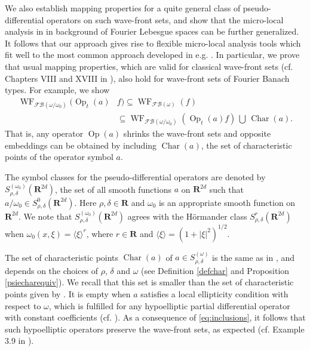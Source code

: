\documentclass[12pt,a4paper,reqno]{amsart}
\numberwithin{equation}{section}
\numberwithin{thm}{section}
\theoremstyle{definition}
\theoremstyle{remark}
\begin{document}
We also establish mapping properties for a quite general class of
pseudo-differential operators on such wave-front sets, 
and show that the micro-local analysis in \cite{PTT1} in background
of Fourier Lebesgue spaces can be further generalized. It follows that our approach
gives rise to flexible micro-local analysis tools which fit well to
the most common approach developed in e.g. \cite {Ho1,
Hrm-nonlin}. In particular, we prove that
usual mapping properties, which are valid for classical wave-front
sets (cf. Chapters VIII and XVIII in \cite{Ho1}), also hold for
wave-front sets of Fourier Banach types.
For example, we show
\begin{equation}\label{eq:inclusions}
\begin{aligned}
{\operatorname{WF}} _{{\mathscr F\! \mathscr B}(\omega /\omega _0)}({\operatorname{Op}} _t (a) &f)\subseteq {\operatorname{WF}} _{{\mathscr F\! \mathscr B}(\omega
)}(f)\\
&
\subseteq {\operatorname{WF}} _{{\mathscr F\! \mathscr B}(\omega /\omega
_0)}({\operatorname{Op}} _t (a) f){{\textstyle{\, \bigcup \, }}} {\operatorname{Char}} (a).
\end{aligned}
\end{equation}
That is, any operator
${\operatorname{Op}} (a)$ shrinks the wave-front sets and opposite embeddings can be
obtained by including ${\operatorname{Char}} (a)$, the set of characteristic points of
the operator symbol $a$.

\par

The symbol classes for the pseudo-differential operators are denoted by
$S_{\rho ,\delta}^{(\omega _0)}({\mathbf R^{{2d}}})$, the set of all
smooth functions $a$ on ${\mathbf R^{{2d}}}$ such that $a/\omega _0\in S^0_{\rho
,\delta}({\mathbf R^{{2d}}})$. Here $\rho ,\delta \in \mathbf R$ and $\omega_0$ is
an appropriate smooth function on ${\mathbf R^{{2d}}}$. We note that $S_{\rho ,\delta}^{(\omega _0)}({\mathbf R^{{2d}}})$ agrees
with the H{\"o}rmander class $S^r_{\rho ,\delta}({\mathbf R^{{2d}}})$ when
$\omega _0(x, \xi )={\langle \xi\rangle} ^r$, where $r\in \mathbf R$ and ${\langle \xi\rangle}
=(1+|\xi |^2)^{1/2}$.

\par

The set of characteristic points ${\operatorname{Char}} (a)$ of $a\in
S_{\rho ,\delta}^{(\omega )}$ is the same as in \cite{PTT1}, and
depends on the choices of
$\rho$, $\delta$ and $\omega$ (see Definition \ref{defchar} and
Proposition \ref{psiecharequiv}).
We recall that this set is smaller than the set of characteristic
points given by \cite{Ho1}. It is empty when $a$ satisfies a local
ellipticity condition
with respect to $\omega$, which is fulfilled for any hypoelliptic
partial differential operator with constant coefficients
(cf. \cite{PTT1}). As a consequence of \eqref{eq:inclusions}, it follows that such hypoelliptic
operators preserve the wave-front sets, as expected (cf. Example
3.9 in \cite{PTT1}).
\end{document}
